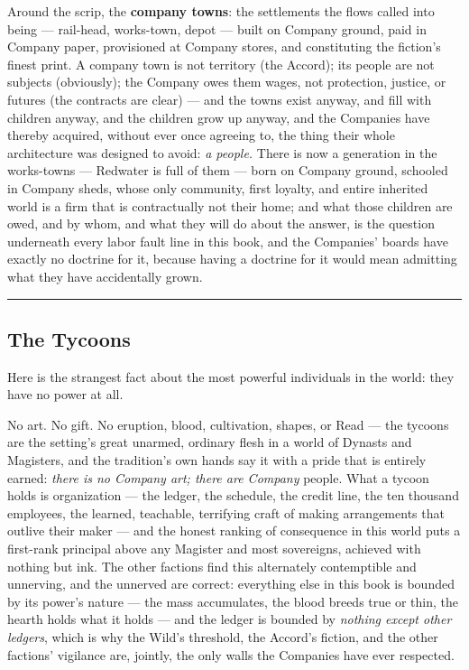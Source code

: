 Around the scrip, the \textbf{company towns}: the settlements the flows called into being --- rail-head, works-town, depot --- built on Company ground, paid in Company paper, provisioned at Company stores, and constituting the fiction's finest print. A company town is not territory (the Accord); its people are not subjects (obviously); the Company owes them wages, not protection, justice, or futures (the contracts are clear) --- and the towns exist anyway, and fill with children anyway, and the children grow up anyway, and the Companies have thereby acquired, without ever once agreeing to, the thing their whole architecture was designed to avoid: \textit{a people.} There is now a generation in the works-towns --- Redwater is full of them --- born on Company ground, schooled in Company sheds, whose only community, first loyalty, and entire inherited world is a firm that is contractually not their home; and what those children are owed, and by whom, and what they will do about the answer, is the question underneath every labor fault line in this book, and the Companies' boards have exactly no doctrine for it, because having a doctrine for it would mean admitting what they have accidentally grown.

\medskip\hrule\medskip

\subsection{The Tycoons}

Here is the strangest fact about the most powerful individuals in the world: they have no power at all.

No art. No gift. No eruption, blood, cultivation, shapes, or Read --- the tycoons are the setting's great unarmed, ordinary flesh in a world of Dynasts and Magisters, and the tradition's own hands say it with a pride that is entirely earned: \textit{there is no Company art; there are Company} people. What a tycoon holds is organization --- the ledger, the schedule, the credit line, the ten thousand employees, the learned, teachable, terrifying craft of making arrangements that outlive their maker --- and the honest ranking of consequence in this world puts a first-rank principal above any Magister and most sovereigns, achieved with nothing but ink. The other factions find this alternately contemptible and unnerving, and the unnerved are correct: everything else in this book is bounded by its power's nature --- the mass accumulates, the blood breeds true or thin, the hearth holds what it holds --- and the ledger is bounded by \textit{nothing except other ledgers}, which is why the Wild's threshold, the Accord's fiction, and the other factions' vigilance are, jointly, the only walls the Companies have ever respected.

